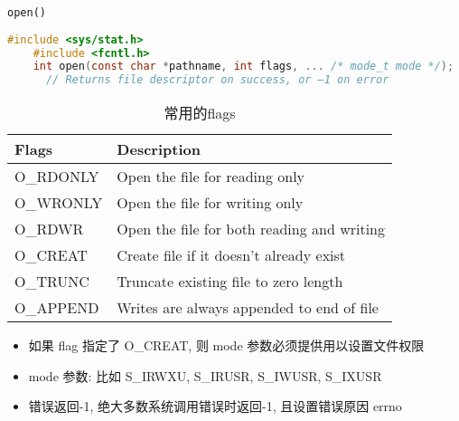 \begin{frame}[fragile]{\texttt{open()}}
    \scriptsize
    \begin{lstlisting}[language=c]
    #include <sys/stat.h>
    #include <fcntl.h>
    int open(const char *pathname, int flags, ... /* mode_t mode */);
      // Returns file descriptor on success, or –1 on error
    \end{lstlisting}
    \begin{table}[]
        \begin{tabular}{|l|l|}
            \hline
            Flags & Description \\ \hline
            O\_RDONLY & Open the file for reading only \\ \hline
            O\_WRONLY & Open the file for writing only \\ \hline
            O\_RDWR & Open the file for both reading and writing \\ \hline
            O\_CREAT & Create file if it doesn’t already exist \\ \hline
            O\_TRUNC & Truncate existing file to zero length \\ \hline
            O\_APPEND & Writes are always appended to end of file \\ \hline
        \end{tabular}
        \caption{常用的flags}
    \end{table}
    \small
    \begin{itemize}[<+- | alert@+>]
        \item 如果 flag 指定了 O\_CREAT, 则 mode 参数必须提供用以设置文件权限
        \item mode 参数: 比如 S\_IRWXU, S\_IRUSR, S\_IWUSR, S\_IXUSR
        \item 错误返回-1, 绝大多数系统调用错误时返回-1, 且设置错误原因 errno
    \end{itemize}
\end{frame}

